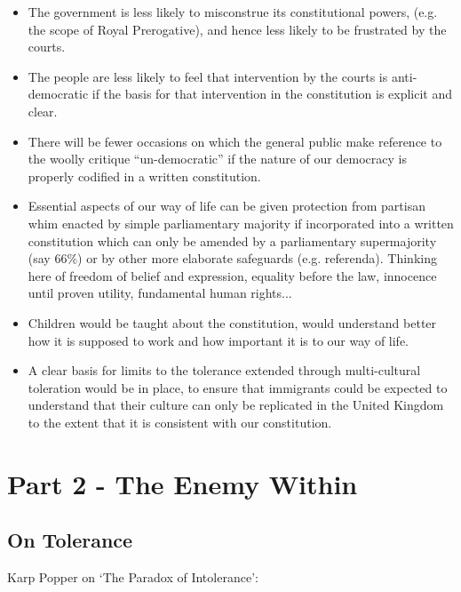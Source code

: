 \documentclass[14pt,titlepage]{extarticle}
\begin{document}
\begin{itemize}
\item The government is less likely to misconstrue its constitutional powers, (e.g. the scope of Royal Prerogative), and hence less likely to be frustrated by the courts.
\item The people are less likely to feel that intervention by the courts is anti-democratic if the basis for that intervention in the constitution is explicit and clear.
\item There will be fewer occasions on which the general public make reference to the woolly critique ``un-democratic'' if the nature of our democracy is properly codified in a written constitution.
\item Essential aspects of our way of life can be given protection from partisan whim enacted by simple parliamentary majority if incorporated into a written constitution which can only be amended by a parliamentary supermajority (say 66\%) or by other more elaborate safeguards (e.g. referenda).
  Thinking here of freedom of belief and expression, equality before the law, innocence until proven utility, fundamental human rights...
\item Children would be taught about the constitution, would understand better how it is supposed to work and how important it is to our way of life.
\item A clear basis for limits to the tolerance extended through multi-cultural toleration would be in place, to ensure that immigrants could be expected to understand that their culture can only be replicated in the United Kingdom to the extent that it is consistent with our constitution.
\end{itemize}

\section{Part 2 - The Enemy Within}\label{part2}

\subsection{On Tolerance}

Karp Popper on `The Paradox of Intolerance':
\end{document}

